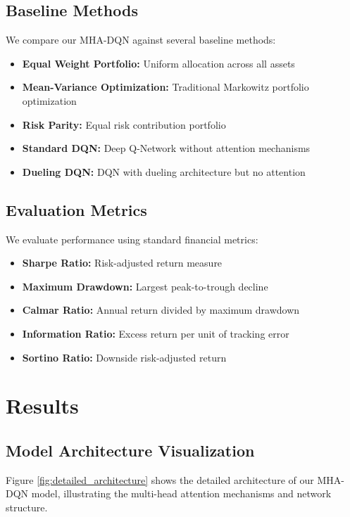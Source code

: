 \documentclass[11pt]{article}
\begin{document}
\subsection{Baseline Methods}

We compare our MHA-DQN against several baseline methods:

\begin{itemize}
    \item \textbf{Equal Weight Portfolio:} Uniform allocation across all assets
    \item \textbf{Mean-Variance Optimization:} Traditional Markowitz portfolio optimization
    \item \textbf{Risk Parity:} Equal risk contribution portfolio
    \item \textbf{Standard DQN:} Deep Q-Network without attention mechanisms
    \item \textbf{Dueling DQN:} DQN with dueling architecture but no attention
\end{itemize}

\subsection{Evaluation Metrics}

We evaluate performance using standard financial metrics:

\begin{itemize}
    \item \textbf{Sharpe Ratio:} Risk-adjusted return measure
    \item \textbf{Maximum Drawdown:} Largest peak-to-trough decline
    \item \textbf{Calmar Ratio:} Annual return divided by maximum drawdown
    \item \textbf{Information Ratio:} Excess return per unit of tracking error
    \item \textbf{Sortino Ratio:} Downside risk-adjusted return
\end{itemize}

\section{Results}

\subsection{Model Architecture Visualization}

Figure \ref{fig:detailed_architecture} shows the detailed architecture of our MHA-DQN model, illustrating the multi-head attention mechanisms and network structure.
\end{document}
